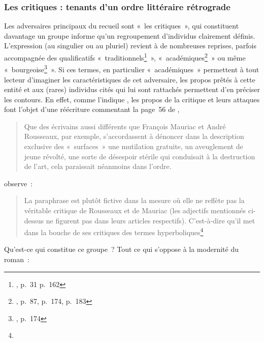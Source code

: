 \documentclass[12pt, a4paper]{article}
\begin{document}



\subsubsection{Les critiques : tenants d'un ordre littéraire rétrograde}


Les adversaires principaux du recueil sont «~les critiques~», qui constituent davantage un groupe informe qu'un regroupement d'individus clairement définis. L'expression (au singulier ou au pluriel) revient à de nombreuses reprises, parfois accompagnée des qualificatifs «~traditionnels\footnote{, p.~31 p.~162}~», «~académiques\footnote{, p.~87, p.~174, p.~183}~» ou même «~bourgeoise\footnote{, p.~174}~». Si ces termes, en particulier «~académiques~» permettent à tout lecteur d'imaginer les caractéristiques de cet adversaire, les propos prêtés à cette entité et aux (rares) individus cités qui lui sont rattachés permettent d'en préciser les contours. En effet, comme l'indique \galia, les propos de la critique et leurs attaques font l'objet d'une réécriture commentant la page~56 de \punr,
\begin{quote}
    Que des écrivains aussi différents que François Mauriac et André Rousseaux, par exemple, s’accordassent à dénoncer dans la description exclusive des «~surfaces~» une mutilation gratuite, un aveuglement de jeune révolté, une sorte de désespoir stérile qui conduisait à la destruction de l’art, cela paraissait néanmoins dans l’ordre.
\end{quote}
\galia{} observe~:
\begin{quote}
    La paraphrase est plutôt fictive dans la mesure où elle ne reflète pas la véritable critique de Rousseaux et de Mauriac (les adjectifs mentionnés ci-dessus ne figurent pas dans leurs articles respectifs). C’est-à-dire qu’il met dans la bouche de ses critiques des termes hyperboliques\footnote{}
\end{quote}
Qu'est-ce qui constitue ce groupe~? Tout ce qui s'oppose à la modernité du roman~:
\end{document}
